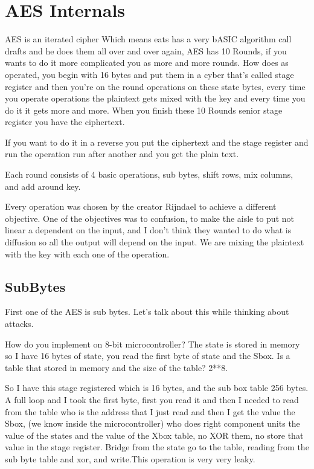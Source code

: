 \section{AES Internals}
AES is an iterated cipher Which means eats has a very bASIC algorithm call drafts and he does them all over and over again, AES has 10 Rounds, if you wants to do it more complicated you as more and more rounds. How does as operated, you begin with 16 bytes and put them in a cyber that's called stage register and then you're on the round operations on these state bytes, every time you operate operations the plaintext gets mixed with the key and every time you do it it gets more and more. When you finish these 10 Rounds senior stage register you have the ciphertext.

If you want to do it in a reverse you put the ciphertext and the stage register and run the operation run after another and you get the plain text.

Each round consists of 4 basic operations, sub bytes, shift rows, mix columns, and add around key.

Every operation was chosen by the creator Rijndael to achieve a different objective. One of the objectives was to confusion, to make the aisle to put not linear a dependent on the input, and I don't think they wanted to do what is diffusion so all the output will depend on the input. We are mixing the plaintext with the key with each one of the operation.

\subsection{SubBytes}
First one of the AES is sub bytes. Let's talk about this while thinking about attacks. 

How do you implement on 8-bit microcontroller? The state is stored in memory so I have 16 bytes of state, you read the first byte of state and the Sbox. Is a table that stored in memory and the size of the table? 2**8. 

So I have this stage registered which is 16 bytes, and the sub box table 256 bytes. A full loop and I took the first byte, first you read it and then I needed to read from the table who is the address that I just read and then I get the value the Sbox, (we know inside the microcontroller) who does right component units the value of the states and the value of the Xbox table, no XOR them, no store that value in the stage register. Bridge from the state go to the table, reading from the sub byte table and xor, and write.This operation is very very leaky.

